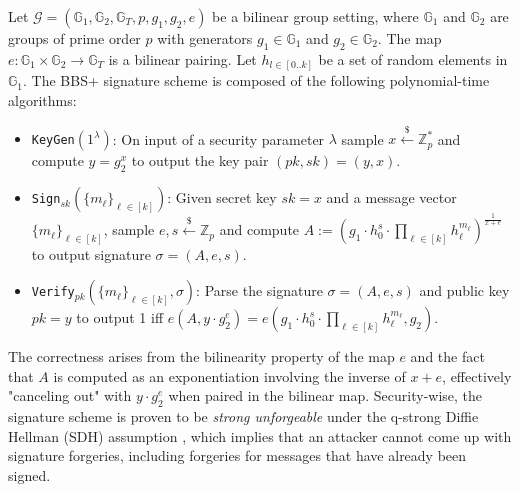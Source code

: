 \begin{construction}
Let $\mathcal{G} = (\mathbb{G}_1, \mathbb{G}_2, \mathbb{G}_T, p, g_1, g_2, e)$ be a bilinear group setting, where $\mathbb{G}_1$ and $\mathbb{G}_2$ are groups of prime order $p$ with generators $g_1 \in \mathbb{G}_1$ and $g_2 \in \mathbb{G}_2$. The map $e: \mathbb{G}_1 \times \mathbb{G}_2 \rightarrow \mathbb{G}_T$ is a bilinear pairing. Let $h_{l \in [0..k]}$ be a set of random elements in $\mathbb{G}_1$. The BBS+ signature scheme is composed of the following polynomial-time algorithms:
\begin{itemize}
    \item \texttt{\textup{KeyGen}}$(1^\lambda)$: On input of a security parameter $\lambda$ sample $x \stackrel{\$}{\leftarrow} \mathbb{Z}_p^*$ and compute $y = g_2^x$ to output the key pair $(pk, sk) = (y, x)$.
    \item \texttt{\textup{Sign}}$_{sk}$$(\{m_{\ell}\}_{\ell \in [k]})$: Given secret key $sk = x$ and a message vector $\{m_{\ell}\}_{\ell \in [k]}$, sample $e, s \stackrel{\$}{\leftarrow} \mathbb{Z}_p$ and compute $A := \left( g_1\cdot h_0^s\cdot \prod_{\ell \in [k]} h_{\ell}^{m_{\ell}} \right)^{\frac{1}{x+e}}$ to output signature $\sigma = (A, e, s)$.
    \item \texttt{\textup{Verify}}$_{pk}$$(\{m_{\ell}\}_{\ell \in [k]}, \sigma)$: Parse the signature $\sigma = (A, e, s)$ and public key $pk = y$ to output 1 iff $e(A, y \cdot g_2^e) = e(g_1\cdot h_0^s \cdot \prod_{\ell \in [k]} h_{\ell}^{m_{\ell}}, g_2)$.
\end{itemize}
\label{definition:bbs+}
\end{construction}
The correctness arises from the bilinearity property of the map $e$ and the fact that $A$ is computed as an exponentiation involving the inverse of $x+e$, effectively "canceling out" with $y \cdot g_2^e$ when paired in the bilinear map. Security-wise, the signature scheme is proven to be \textit{strong unforgeable} under the q-strong Diffie Hellman (SDH) assumption \cite{au2006constant}, which implies that an attacker cannot come up with signature forgeries, including forgeries for messages that have already been signed.
